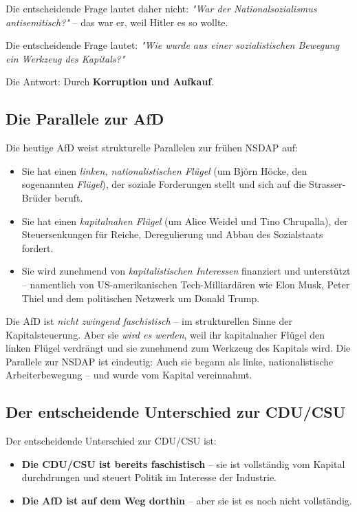 Die entscheidende Frage lautet daher nicht: \emph{"War der Nationalsozialismus antisemitisch?"} – das war er, weil Hitler es so wollte.

Die entscheidende Frage lautet: \emph{"Wie wurde aus einer sozialistischen Bewegung ein Werkzeug des Kapitals?"}

Die Antwort: Durch \textbf{Korruption und Aufkauf}.

\subsection{Die Parallele zur AfD}

Die heutige AfD weist strukturelle Parallelen zur frühen NSDAP auf:

\begin{itemize}
    \item Sie hat einen \emph{linken, nationalistischen Flügel} (um Björn Höcke, den sogenannten \emph{Flügel}), der soziale Forderungen stellt und sich auf die Strasser-Brüder beruft.
    \item Sie hat einen \emph{kapitalnahen Flügel} (um Alice Weidel und Tino Chrupalla), der Steuersenkungen für Reiche, Deregulierung und Abbau des Sozialstaats fordert.
    \item Sie wird zunehmend von \emph{kapitalistischen Interessen} finanziert und unterstützt – namentlich von US-amerikanischen Tech-Milliardären wie Elon Musk, Peter Thiel und dem politischen Netzwerk um Donald Trump.
\end{itemize}

Die AfD ist \emph{nicht zwingend faschistisch} – im strukturellen Sinne der Kapitalsteuerung. Aber sie \emph{wird es werden}, weil ihr kapitalnaher Flügel den linken Flügel verdrängt und sie zunehmend zum Werkzeug des Kapitals wird. Die Parallele zur NSDAP ist eindeutig: Auch sie begann als linke, nationalistische Arbeiterbewegung – und wurde vom Kapital vereinnahmt.

\subsection{Der entscheidende Unterschied zur CDU/CSU}

Der entscheidende Unterschied zur CDU/CSU ist:

\begin{itemize}
    \item \textbf{Die CDU/CSU ist bereits faschistisch} – sie ist vollständig vom Kapital durchdrungen und steuert Politik im Interesse der Industrie.
    \item \textbf{Die AfD ist auf dem Weg dorthin} – aber sie ist es noch nicht vollständig.
\end{itemize}

